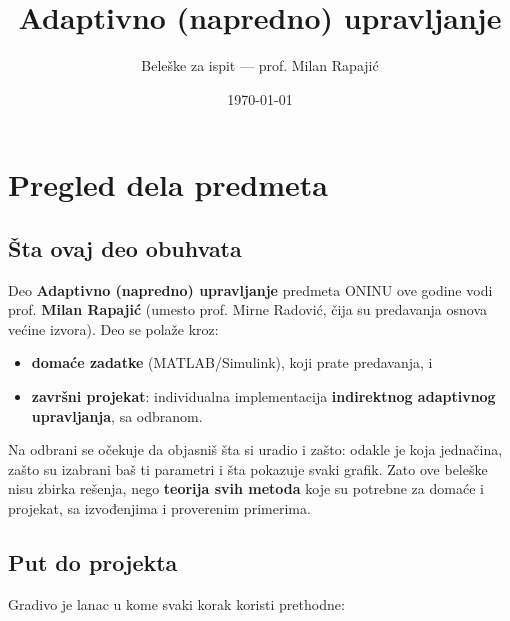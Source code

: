 \documentclass[11pt,a4paper,parskip=half,headsepline,numbers=noenddot]{scrartcl}
\title{Adaptivno (napredno) upravljanje}
\subtitle{Beleške za ispit --- prof. Milan Rapajić}
\author{}
\date{\today}
\begin{document}
\maketitle
\thispagestyle{plain.scrheadings}
\tableofcontents
\clearpage

\section{Pregled dela predmeta}

\subsection{Šta ovaj deo obuhvata}

Deo \textbf{Adaptivno (napredno) upravljanje} predmeta ONINU ove godine vodi prof. \textbf{Milan Rapajić} (umesto prof. Mirne Radović, čija su predavanja osnova većine izvora). Deo se polaže kroz:

\begin{itemize}
\item \textbf{domaće zadatke} (MATLAB/Simulink), koji prate predavanja, i
\item \textbf{završni projekat}: individualna implementacija \textbf{indirektnog adaptivnog upravljanja}, sa odbranom.
\end{itemize}

Na odbrani se očekuje da objasniš šta si uradio i zašto: odakle je koja jednačina, zašto su izabrani baš ti parametri i šta pokazuje svaki grafik. Zato ove beleške nisu zbirka rešenja, nego \textbf{teorija svih metoda} koje su potrebne za domaće i projekat, sa izvođenjima i proverenim primerima.

\subsection{Put do projekta}

Gradivo je lanac u kome svaki korak koristi prethodne:
\end{document}
